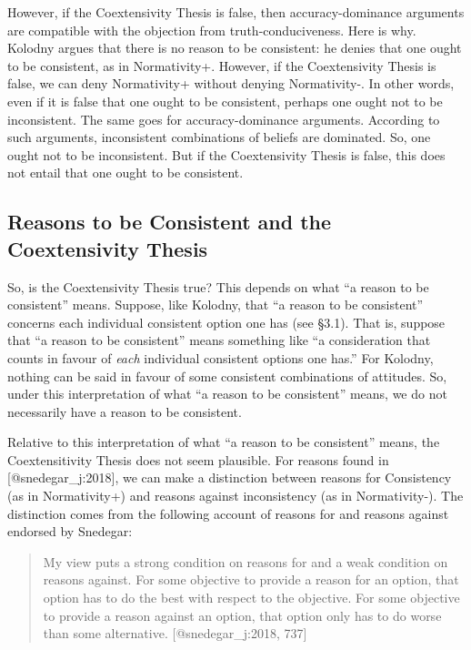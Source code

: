 \documentclass[
]{article}
\begin{document}
However, if the Coextensivity Thesis is false, then accuracy-dominance
arguments are compatible with the objection from truth-conduciveness.
Here is why. Kolodny argues that there is no reason to be consistent: he
denies that one ought to be consistent, as in Normativity+. However, if
the Coextensivity Thesis is false, we can deny Normativity+ without
denying Normativity-. In other words, even if it is false that one ought
to be consistent, perhaps one ought not to be inconsistent. The same
goes for accuracy-dominance arguments. According to such arguments,
inconsistent combinations of beliefs are dominated. So, one ought not to
be inconsistent. But if the Coextensivity Thesis is false, this does not
entail that one ought to be consistent.

\hypertarget{PREFIXreasons-to-be-consistent-and-the-coextensivity-thesis}{%
\subsection{Reasons to be Consistent and the Coextensivity
Thesis}\label{PREFIXreasons-to-be-consistent-and-the-coextensivity-thesis}}

So, is the Coextensivity Thesis true? This depends on what ``a reason to
be consistent'' means. Suppose, like Kolodny, that ``a reason to be
consistent'' concerns each individual consistent option one has (see
§3.1). That is, suppose that ``a reason to be consistent'' means
something like ``a consideration that counts in favour of \emph{each}
individual consistent options one has.'' For Kolodny, nothing can be
said in favour of some consistent combinations of attitudes. So, under
this interpretation of what ``a reason to be consistent'' means, we do
not necessarily have a reason to be consistent.

Relative to this interpretation of what ``a reason to be consistent''
means, the Coextensitivity Thesis does not seem plausible. For reasons
found in {[}@snedegar\_j:2018{]}, we can make a distinction between
reasons for Consistency (as in Normativity+) and reasons against
inconsistency (as in Normativity-). The distinction comes from the
following account of reasons for and reasons against endorsed by
Snedegar:

\begin{quote}
My view puts a strong condition on reasons for and a weak condition on
reasons against. For some objective to provide a reason for an option,
that option has to do the best with respect to the objective. For some
objective to provide a reason against an option, that option only has to
do worse than some alternative. {[}@snedegar\_j:2018, 737{]}
\end{quote}
\end{document}

